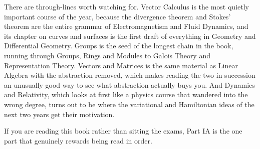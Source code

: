 There are through-lines worth watching for. Vector Calculus is the most quietly
important course of the year, because the divergence theorem and Stokes' theorem are
the entire grammar of Electromagnetism and Fluid Dynamics, and its chapter on curves
and surfaces is the first draft of everything in Geometry and Differential Geometry.
Groups is the seed of the longest chain in the book, running through Groups, Rings and
Modules to Galois Theory and Representation Theory. Vectors and Matrices is the same
material as Linear Algebra with the abstraction removed, which makes reading the two in
succession an unusually good way to see what abstraction actually buys you. And
Dynamics and Relativity, which looks at first like a physics course that wandered into
the wrong degree, turns out to be where the variational and Hamiltonian ideas of the
next two years get their motivation.

If you are reading this book rather than sitting the exams, Part IA is the one part
that genuinely rewards being read in order.
